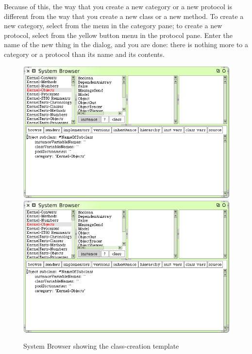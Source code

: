 \documentclass[a4paper,10pt,twoside]{book}
\begin{document}
Because of this, the way that you create a new category or a new protocol is different from the way that you create a new class or a new method.  To create a new category, select  from the  menu in the category pane; to create a new protocol, select  from the yellow button menu in the protocol pane. 
Enter the name of the new thing in the dialog, and you are done: there is nothing more to a category or a protocol than its name and its contents.

\begin{figure}[htbp]
   \centering
   \ifluluelse
	   {\includegraphics[width=\textwidth]{SystemBrowserClassCreation}}
	   {\includegraphics[scale=.7]{SystemBrowserClassCreation}}
   \caption{System Browser showing the class-creation template
   \label{fig:SystemBrowserClassCreation}}
\end{figure}
\end{document}

